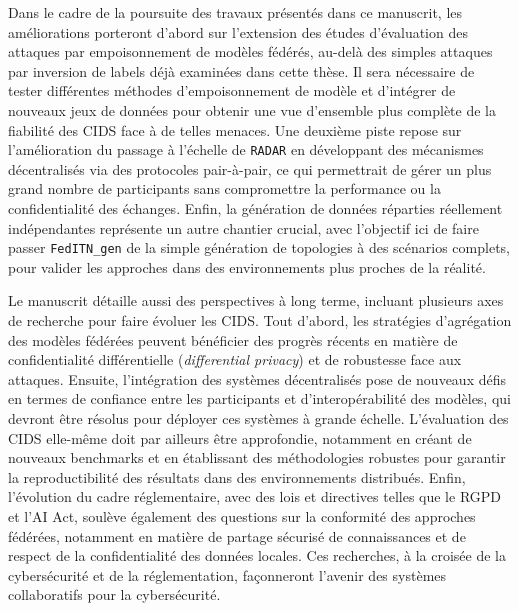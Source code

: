Dans le cadre de la poursuite des travaux présentés dans ce manuscrit, les améliorations porteront d'abord sur l'extension des études d'évaluation des attaques par empoisonnement de modèles fédérés, au-delà des simples attaques par inversion de labels déjà examinées dans cette thèse.
Il sera nécessaire de tester différentes méthodes d'empoisonnement de modèle et d'intégrer de nouveaux jeux de données pour obtenir une vue d'ensemble plus complète de la fiabilité des CIDS face à de telles menaces.
Une deuxième piste repose sur l'amélioration du passage à l'échelle de \texttt{RADAR} en développant des mécanismes décentralisés via des protocoles pair-à-pair, ce qui permettrait de gérer un plus grand nombre de participants sans compromettre la performance ou la confidentialité des échanges.
Enfin, la génération de données réparties réellement indépendantes représente un autre chantier crucial, avec l'objectif ici de faire passer \verb|FedITN_gen| de la simple génération de topologies à des scénarios complets, pour valider les approches dans des environnements plus proches de la réalité.

Le manuscrit détaille aussi des perspectives à long terme, incluant plusieurs axes de recherche pour faire évoluer les CIDS.
Tout d'abord, les stratégies d'agrégation des modèles fédérées peuvent bénéficier des progrès récents en matière de confidentialité différentielle (\emph{differential privacy}) et de robustesse face aux attaques.
Ensuite, l'intégration des systèmes décentralisés pose de nouveaux défis en termes de confiance entre les participants et d'interopérabilité des modèles, qui devront être résolus pour déployer ces systèmes à grande échelle.
L'évaluation des CIDS elle-même doit par ailleurs être approfondie, notamment en créant de nouveaux benchmarks et en établissant des méthodologies robustes pour garantir la reproductibilité des résultats dans des environnements distribués.
Enfin, l'évolution du cadre réglementaire, avec des lois et directives telles que le RGPD et l'AI Act, soulève également des questions sur la conformité des approches fédérées, notamment en matière de partage sécurisé de connaissances et de respect de la confidentialité des données locales.
Ces recherches, à la croisée de la cybersécurité et de la réglementation, façonneront l'avenir des systèmes collaboratifs pour la cybersécurité.